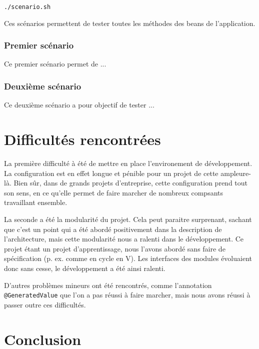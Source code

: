 \documentclass[12pt]{article}
\begin{document}
    \texttt{./scenario.sh}

    Ces scénarios permettent de tester toutes les méthodes des beans de l'application.

    \subsubsection{Premier scénario}
    Ce premier scénario permet de ...
    \subsubsection{Deuxième scénario}
    Ce deuxième scénario a pour objectif de tester ...
\newpage
\section{Difficultés rencontrées}

La première difficulté à été de mettre en place l'environement de développement.
La configuration est en effet longue et pénible pour un projet de cette ampleure-là.
Bien sûr, dans de grands projets d'entreprise, cette configuration prend tout son sens, en ce qu'elle permet de faire marcher de nombreux compsants travaillant ensemble.

La seconde a été la modularité du projet.
Cela peut paraitre surprenant, sachant que c'est un point qui a été abordé positivement dans la description de l'architecture, mais cette modularité nous a ralenti dans le développement.
Ce projet étant un projet d'apprentissage, nous l'avons abordé sans faire de spécification (p. ex. comme en cycle en V).
Les interfaces des modules évoluaient donc sans cesse, le développement a été ainsi ralenti.

D'autres problèmes mineurs ont été rencontrés, comme l'annotation \texttt{@GeneratedValue} que l'on a pas réussi à faire marcher, mais nous avons réussi à passer outre ces difficultés.

\newpage
\section{Conclusion}
\end{document}
